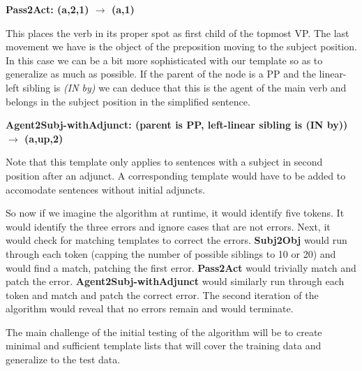 \documentclass{article}
\begin{document}
\begin{center}
\textbf{Pass2Act: (a,2,1) $\rightarrow$ (a,1)}
\end{center}

This places the verb in its proper spot as first child of the topmost VP. The last movement we have is the object of the preposition moving to the subject position. In this case we can be a bit more sophisticated with our template so as to generalize as much as possible. If the parent of the node is a PP and the linear-left sibling is \textit{(IN by)} we can deduce that this is the agent of the main verb and belongs in the subject position in the simplified sentence.

\begin{center}
\textbf{Agent2Subj-withAdjunct: (parent is PP, left-linear sibling is (IN by)) $\rightarrow$ (a,up,2)}
\end{center}

Note that this template only applies to sentences with a subject in second position after an adjunct. A corresponding template would have to be added to accomodate sentences without initial adjuncts.

So now if we imagine the algorithm at runtime, it would identify five tokens. It would identify the three errors and ignore cases that are not errors. Next, it would check for matching templates to correct the errors. \textbf{Subj2Obj} would run through each token (capping the number of possible siblings to 10 or 20) and would find a match, patching the first error. \textbf{Pass2Act} would trivially match and patch the error. \textbf{Agent2Subj-withAdjunct} would similarly run through each token and match and patch the correct error. The second iteration of the algorithm would reveal that no errors remain and would terminate.

The main challenge of the initial testing of the algorithm will be to create minimal and sufficient template lists that will cover the training data and generalize to the test data.
\end{document}
